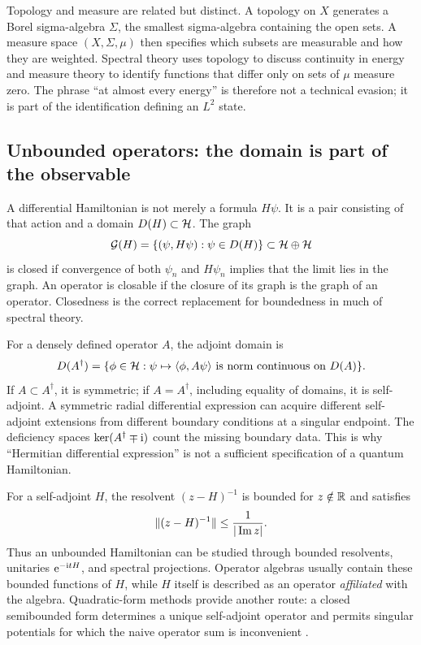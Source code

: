 Topology and measure are related but distinct.  A topology on $X$ generates a
Borel sigma-algebra $\Sigma$, the smallest sigma-algebra containing the open
sets.  A measure space $(X,\Sigma,\mu)$ then specifies which subsets are
measurable and how they are weighted.  Spectral theory uses topology to discuss
continuity in energy and measure theory to identify functions that differ only
on sets of $\mu$ measure zero.  The phrase ``at almost every energy'' is
therefore not a technical evasion; it is part of the identification defining
an $L^2$ state.

\subsection{Unbounded operators: the domain is part of the observable}
\label{subsec:unbounded-operators}

A differential Hamiltonian is not merely a formula $H\psi$.  It is a pair
consisting of that action and a domain $D(H)\subset\mathcal{H}$.  The graph
\begin{equation}
  \mathcal G(H)=\{(\psi,H\psi):\psi\in D(H)\}
  \subset\mathcal{H}\oplus\mathcal{H}
  \label{eq:operator-graph}
\end{equation}
is closed if convergence of both $\psi_n$ and $H\psi_n$ implies that the
limit lies in the graph.  An operator is closable if the closure of its graph
is the graph of an operator.  Closedness is the correct replacement for
boundedness in much of spectral theory.

For a densely defined operator $A$, the adjoint domain is
\begin{equation}
  D(A^\dagger)
  =\{\phi\in\mathcal{H}:
  \text{$\psi\mapsto\langle \phi,A\psi\rangle$ is norm continuous on $D(A)$}\} .
  \label{eq:adjoint-domain}
\end{equation}
If $A\subset A^\dagger$, it is symmetric; if $A=A^\dagger$, including
equality of domains, it is self-adjoint.  A symmetric radial differential
expression can acquire different self-adjoint extensions from different
boundary conditions at a singular endpoint.  The deficiency spaces
$\ker(A^\dagger\mp\mathrm{i})$ count the missing boundary data.  This is why
``Hermitian differential expression'' is not a sufficient specification of a
quantum Hamiltonian.

For a self-adjoint $H$, the resolvent $(z-H)^{-1}$ is bounded for
$z\notin\mathbb{R}$ and satisfies
\begin{equation}
  \|(z-H)^{-1}\|\leq\frac{1}{|\operatorname{Im} z|} .
  \label{eq:self-adjoint-resolvent-bound}
\end{equation}
Thus an unbounded Hamiltonian can be studied through bounded resolvents,
unitaries $\mathrm{e}^{-\mathrm{i} tH}$, and spectral projections.  Operator algebras
usually contain these bounded functions of $H$, while $H$ itself is described
as an operator \textit{affiliated} with the algebra.  Quadratic-form methods
provide another route: a closed semibounded form determines a unique
self-adjoint operator and permits singular potentials for which the naive
operator sum is inconvenient \cite{ReedSimonI:1980}.

